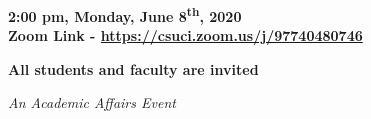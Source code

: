 \documentclass{article}
\begin{document}
\hfill\break

\begin{center}

\LARGE
{\bf 2:00 pm, Monday, June 8\textsuperscript{th}, 2020}\\

\large
{\bf 
Zoom Link - \href{https://csuci.zoom.us/j/97740480746}{https://csuci.zoom.us/j/97740480746}}\\

\vspace{15mm}

\large
{\bf All students and faculty are invited}\\

\hfill\break

\small
{\it An Academic Affairs Event}

\end{center}
\end{document}
